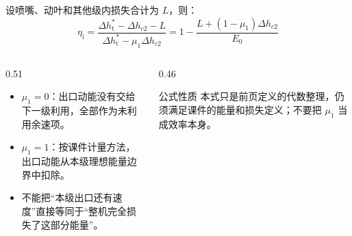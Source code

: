 \begin{frame}[t,shrink]{}
设喷嘴、动叶和其他级内损失合计为 \(L\)，则：
$$
\eta_{\mathrm{i}}
=\frac{\Delta h_{\mathrm{t}}^*-\Delta h_{c2}-L}
{\Delta h_{\mathrm{t}}^*-\mu_1\Delta h_{c2}}
=1-\frac{L+\left(1-\mu_1\right)\Delta h_{c2}}{E_0}
$$
\begin{columns}[T,onlytextwidth]
\begin{column}{0.51\textwidth}
  \begin{itemize}
    \item \(\mu_1=0\)：出口动能没有交给下一级利用，全部作为未利用余速项。
    \item \(\mu_1=1\)：按课件计量方法，出口动能从本级理想能量边界中扣除。
    \item 不能把“本级出口还有速度”直接等同于“整机完全损失了这部分能量”。
  \end{itemize}
\end{column}
\begin{column}{0.46\textwidth}
  \begin{amberbox}{公式性质}
  \small 本式只是前页定义的代数整理，仍须满足课件的能量和损失定义；不要把 \(\mu_1\) 当成效率本身。
  \end{amberbox}
\end{column}
\end{columns}
\end{frame}

